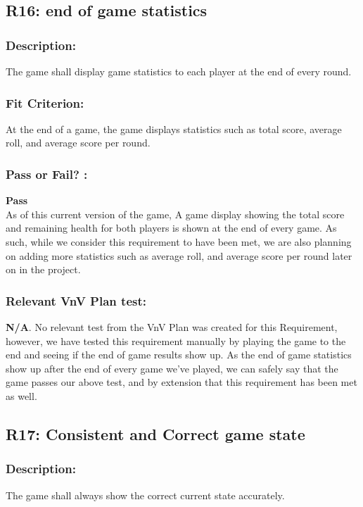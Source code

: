 \documentclass[12pt, titlepage]{article}
\begin{document}
\subsection{R16: end of game statistics} 
\label{R16} 

\subsubsection*{Description:}The game shall display game statistics to each player at the end of every round.

\subsubsection*{Fit Criterion:}At the end of a game, the game displays statistics such as total score, average roll, and average score per round.

\subsubsection*{Pass or Fail? :} 

 \noindent \textbf{Pass}\\
 
 \noindent As of this current version of the game, A game display showing the total score and remaining health for both players is shown at the end of every game. As such, while we consider this requirement to have been met, we are also planning on adding more statistics such as average roll, and average score per round later on in the project.
 
 \subsubsection*{Relevant VnV Plan test: } \textbf{N/A}. No relevant test from the VnV Plan was created for this Requirement, however, we have tested this requirement manually by playing the game to the end and seeing if the end of game results show up. As the end of game statistics show up after the end of every game we've played, we can safely say that the game passes our above test, and by extension that this requirement has been met as well.


\subsection{R17: Consistent and Correct game state} 
\label{R17} 

\subsubsection*{Description:} The game shall always show the correct current state accurately.
\end{document}

